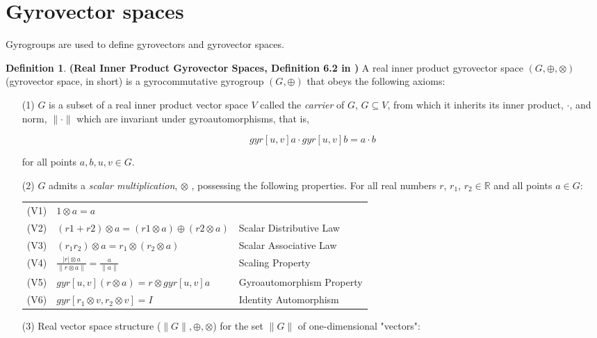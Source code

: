 \documentclass[a4paper]{article}
\theoremstyle{definition}
\newtheorem{definition}{Definition}[section]
\begin{document}
\section{Gyrovector spaces}\label{sec:gyrovectorspaces}

Gyrogroups are used to define gyrovectors and gyrovector spaces.

\begin{definition} \textbf{(Real Inner Product Gyrovector Spaces, Definition 6.2 in
    \cite{ungar-analytic})} A real inner product gyrovector space
  $(G, \oplus, \otimes)$ (gyrovector space, in short) is a
  gyrocommutative gyrogroup $(G, \oplus)$ that obeys the following
  axioms:
\begin{itemize}
\item[(1)] $G$ is a subset of a real inner product vector space $V$
  called the \emph{carrier} of $G$, $G \subseteq V$, from which it
  inherits its inner product, $\cdot$, and norm, $\lVert \cdot \rVert$
  which are invariant under gyroautomorphisms, that is,
  
  $$gyr[u, v ] a \cdot gyr [ u , v]b = a \cdot b$$

  for all points $a, b, u, v \in G$.
  
\item[(2)] $G$ admits a \emph{scalar multiplication}, $\otimes$ ,
  possessing the following properties. For all real numbers $r$,
  $r_1$,
  $r_2 \in \mathbb{R}$ and all points $a \in G$:\\[2mm]
  \begin{tabular}{cll}
    (V1) & $1\otimes a = a$ & \\[1mm]
    (V2) & $(r1 + r2) \otimes a = (r1 \otimes a) \oplus (r2 \otimes a)$ & Scalar Distributive Law\\[1mm]
    (V3) & $(r_1r_2)\otimes a = r_1 \otimes (r_2 \otimes a)$ & Scalar Associative Law\\[1mm]
    (V4) & $\frac{|r|\otimes a}{\lVert r \otimes a \rVert} = \frac{a}{\lVert a \rVert}$ & Scaling Property\\[1mm]
    (V5) & $gyr[u,v](r\otimes a) = r \otimes gyr[u,v]a$ & Gyroautomorphism Property\\[1mm]
    (V6) & $gyr[r_1\otimes v, r_2 \otimes v] = I$ & Identity Automorphism\\
  \end{tabular}

\item[(3)] Real vector space structure
  ($\lVert G \rVert, \oplus, \otimes$) for the set $\lVert G \rVert$
  of one-dimensional "vectors":


\end{itemize}
\end{definition}
\end{document}
